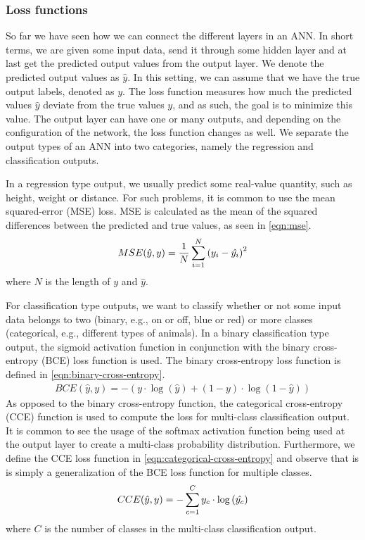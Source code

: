 \subsubsection{Loss functions}
\label{sec:loss-functions-ann}
So far we have seen how we can connect the different layers in an ANN. In short terms, we are given some input data, send it through some hidden layer and at last get the predicted output values from the output layer. We denote the predicted output values as $\hat{y}$. In this setting, we can assume that we have the true output labels, denoted as $y$. The loss function measures how much the predicted values $\hat{y}$ deviate from the true values $y$, and as such, the goal is to minimize this value. The output layer can have one or many outputs, and depending on the configuration of the network, the loss function changes as well. We separate the output types of an ANN into two categories, namely the regression and classification outputs.

In a regression type output, we usually predict some real-value quantity, such as height, weight or distance. For such problems, it is common to use the mean squared-error (MSE) loss. MSE is calculated as the mean of the squared differences between the predicted and true values, as seen in \cref{eqn:mse}.
\begin{align}
    \label{eqn:mse}
    MSE(\hat{y}, y) = \frac{1}{N} \sum\limits_{i=1}^{N} {\left( y_i - \hat{y_i} \right)}^2
\end{align}
where $N$ is the length of $y$ and $\hat{y}$.

For classification type outputs, we want to classify whether or not some input data belongs to two (binary, e.g., on or off, blue or red) or more classes (categorical, e.g., different types of animals). In a binary classification type output, the sigmoid activation function in conjunction with the binary cross-entropy (BCE) loss function is used. The binary cross-entropy loss function is defined in \cref{eqn:binary-cross-entropy}.
\begin{align}
    \label{eqn:binary-cross-entropy}
    BCE(\hat{y}, y) = -\left( y \cdot \log{\left( \hat{y} \right)} + (1 - y) \cdot \log{\left( 1 - \hat{y} \right)} \right)
\end{align}
As opposed to the binary cross-entropy function, the categorical cross-entropy (CCE) function is used to compute the loss for multi-class classification output. It is common to see the usage of the softmax activation function being used at the output layer to create a multi-class probability distribution. Furthermore, we define the CCE loss function in \cref{eqn:categorical-cross-entropy} and observe that is is simply a generalization of the BCE loss function for multiple classes.
\begin{align}
    \label{eqn:categorical-cross-entropy}
    CCE(\hat{y}, y) = -\sum\limits_{c=1}^{C} y_c \cdot \log{\left( \hat{y_c} \right)}
\end{align}
where $C$ is the number of classes in the multi-class classification output.

